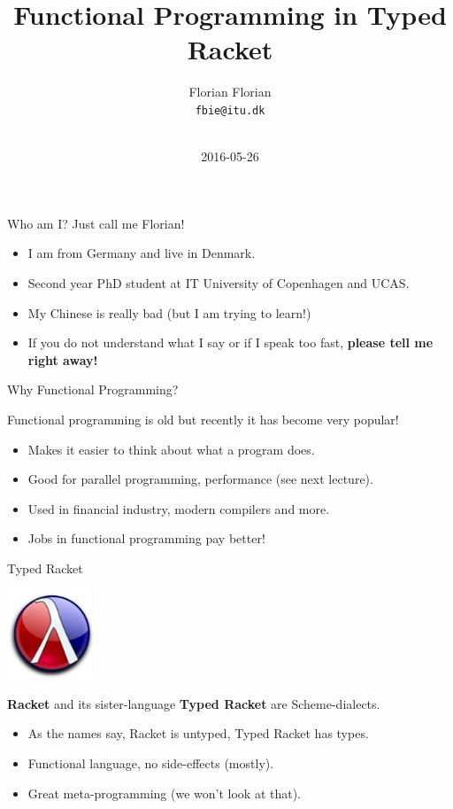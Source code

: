 \documentclass{beamer}
\title{Functional Programming in Typed Racket}
\author{Florian Florian \\\small{\texttt{fbie@itu.dk}} \\~}
\institute{IT University of Copenhagen \& UCAS}
\date{2016-05-26}
\begin{document}
\begin{frame}
  \titlepage{}
\end{frame}

\begin{frame}{Who am I?}
  Just call me Florian!

  \begin{itemize}
  \pause{} \item I am from Germany and live in Denmark.
  \pause{} \item Second year PhD student at IT University of Copenhagen and UCAS.
  \pause{} \item My Chinese is really bad (but I am trying to learn!)
  \pause{} \item If you do not understand what I say or if I speak too fast, \textbf{please tell me right away!}
  \end{itemize}
\end{frame}

\begin{frame}{Why Functional Programming?}

  Functional programming is old but recently it has become very popular!

  \begin{itemize}
  \pause{} \item Makes it easier to think about what a program does.
  \pause{} \item Good for parallel programming, performance (see next lecture).
  \pause{} \item Used in financial industry, modern compilers and more.
  \pause{} \item Jobs in functional programming pay better!
  \end{itemize}

\end{frame}

\begin{frame}{Typed Racket}

  \begin{center}
    \includegraphics[width=0.2\textwidth]{racket.png}
  \end{center}

  \textbf{Racket} and its sister-language \textbf{Typed Racket} are Scheme-dialects.

  \begin{itemize}
  \pause{} \item As the names say, Racket is untyped, Typed Racket has types.
  \pause{} \item Functional language, no side-effects (mostly).
  \pause{} \item Great meta-programming (we won't look at that).
  \end{itemize}
\end{frame}
\end{document}
